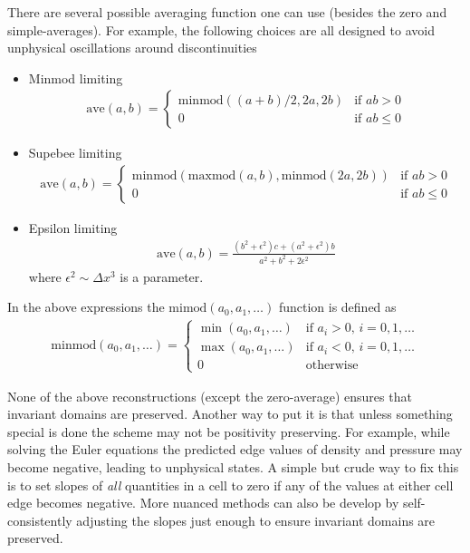 \documentclass[11pt, reqno]{amsart}
\theoremstyle{definition}
\begin{document}
There are several possible averaging function one can use (besides the
zero and simple-averages). For example, the following choices are all
designed to avoid unphysical oscillations around discontinuities
\begin{itemize}
  \item Minmod limiting
    \begin{align}
      \mathrm{ave}(a,b) = 
      \begin{cases}
        \mathrm{minmod}((a+b)/2, 2a, 2b)& \text{if $ab>0$} \\
        0& \text{if $ab\le 0$}
      \end{cases}
    \end{align}

  \item Supebee limiting
    \begin{align}
      \mathrm{ave}(a,b) = 
      \begin{cases}
        \mathrm{minmod}\left(
          \mathrm{maxmod}(a,b), \mathrm{minmod}(2a,2b)
          \right)& \text{if $ab>0$} \\
        0& \text{if $ab\le 0$}
      \end{cases}
    \end{align}

  \item Epsilon limiting
    \begin{align}
      \mathrm{ave}(a,b) = \frac{(b^2+\epsilon^2)c + (a^2+\epsilon^2)b}{a^2+b^2+2\epsilon^2}
    \end{align}
    where $\epsilon^2 \sim \Delta x^3$ is a parameter.
\end{itemize}
In the above expressions the $\mathrm{mimod}(a_0,a_1,\ldots)$ function
is defined as
\begin{align}
  \mathrm{minmod}(a_0,a_1,\ldots) =
  \begin{cases}
    \min(a_0,a_1,\ldots)& \text{if $a_i>0$, $i=0,1,\ldots$} \\
    \max(a_0,a_1,\ldots)& \text{if $a_i<0$, $i=0,1,\ldots$} \\
    0& \text{otherwise}
  \end{cases}
\end{align}

None of the above reconstructions (except the zero-average) ensures
that invariant domains are preserved. Another way to put it is that
unless something special is done the scheme may not be positivity
preserving. For example, while solving the Euler equations the
predicted edge values of density and pressure may become negative,
leading to unphysical states. A simple but crude way to fix this is to
set slopes of \emph{all} quantities in a cell to zero if any of the
values at either cell edge becomes negative. More nuanced methods can
also be develop by self-consistently adjusting the slopes just enough
to ensure invariant domains are preserved.
\end{document}
